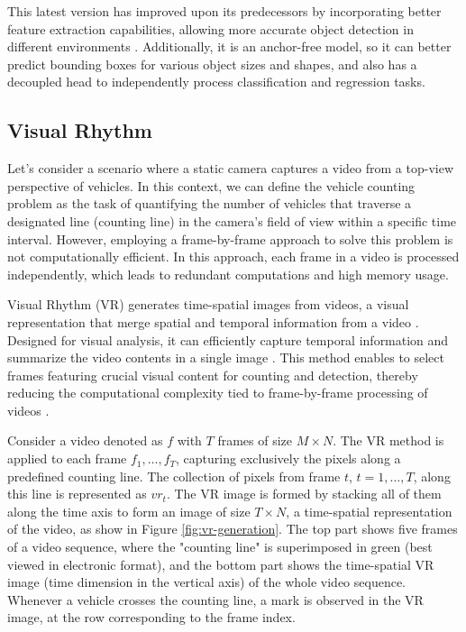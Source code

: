 \documentclass[10pt,conference]{IEEEtran}
\newcommand{\revisao}[1]{{\color{blue}#1}}
\begin{document}
This latest version has improved upon its predecessors by incorporating better feature extraction capabilities, allowing more accurate object detection in different environments \cite{v1-v8}. Additionally, it is an anchor-free model, so it can better predict bounding boxes for various object sizes and shapes, and also has a decoupled head to independently process classification and regression tasks.



\subsection{Visual Rhythm}

Let's consider a scenario where a static camera captures a video from a top-view perspective of vehicles. In this context, we can define the vehicle counting problem as the task of quantifying the number of vehicles that traverse a designated line (counting line) in the camera's field of view within a specific time interval. However, employing a frame-by-frame approach to solve this problem is not computationally efficient. In this approach, each frame in a video is processed independently, which leads to redundant computations and high memory usage.


Visual Rhythm (VR) generates time-spatial images from videos, a visual representation that merge spatial and temporal information from a video \cite{vr-first}. Designed for visual analysis, it can efficiently capture temporal information and summarize the video contents in a single image \cite{VR-definition}. This method enables to select frames featuring crucial visual content for counting and detection, thereby reducing the computational complexity tied to frame-by-frame processing of videos \cite{vr-video}.


Consider a video denoted as $f$ with $T$ frames of size $M \times N$.  The VR method is applied to each frame $f_1, \dots, f_T$, capturing exclusively the pixels along a predefined counting line. The collection of pixels from frame $t$, $t=1,\dots,T$, along this line is represented as ${vr}_t$. The VR image is formed by stacking all of them along the time axis to form an image of size $T \times N$, a time-spatial representation of the video, as show in Figure \ref{fig:vr-generation}. The top part shows five frames of a video sequence, where the "counting line" is superimposed in green (best viewed in electronic format), and the bottom part shows the time-spatial VR image (time dimension in the vertical axis) of the whole video sequence. Whenever a vehicle crosses the counting line, a mark is observed in the VR image, at the row corresponding to the frame index.
\end{document}

